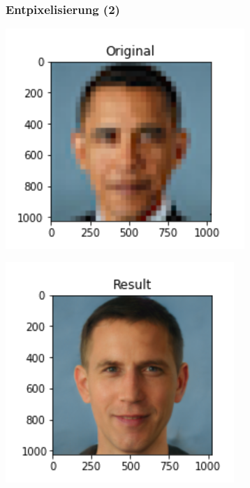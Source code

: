 \documentclass[aspectratio=169,xcolor=dvipsnames]{beamer}
\begin{document}
\begin{frame}
\frametitle{Entpixelisierung (2)}
\begin{minipage}{0.45\textwidth}
\begin{center}
\includegraphics[height=0.64\paperheight,keepaspectratio]{images/obama_depixelise1} 
\end{center}
\end{minipage}\quad\pause \begin{minipage}{0.45\textwidth}
\begin{center}
\includegraphics[height=0.64\paperheight,keepaspectratio]{images/obama_depixelise2} 
\end{center}
\end{minipage}
\end{frame}
\end{document}
